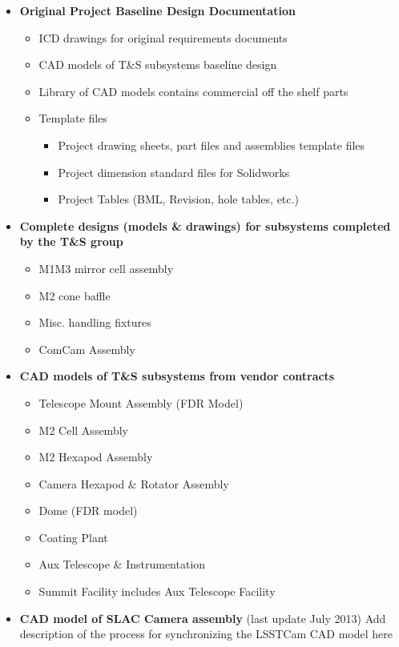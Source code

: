 \begin{itemize}
	\item {\bf Original Project Baseline Design Documentation}
	\begin{itemize}
		\item ICD drawings for original requirements documents
		\item CAD models of T\&S subsystems baseline design
		\item Library of CAD models contains commercial off the shelf parts
		\item Template files
		\begin{itemize}
			\item Project drawing sheets, part files and assemblies template files
			\item Project dimension standard files for Solidworks
			\item Project Tables (BML, Revision, hole tables, etc.)
		\end{itemize}
	\end{itemize}

	\item {\bf Complete designs (models \& drawings) for subsystems completed by the T\&S group}
	\begin{itemize}
		\item M1M3 mirror cell assembly
		\item M2 cone baffle
		\item Misc. handling fixtures
		\item ComCam Assembly
	\end{itemize}

	\item {\bf CAD models of T\&S subsystems from vendor contracts}
	\begin{itemize}
		\item Telescope Mount Assembly (FDR Model)
		\item M2 Cell Assembly
		\item M2 Hexapod Assembly
		\item Camera Hexapod \& Rotator Assembly
		\item Dome (FDR model)
		\item Coating Plant
		\item Aux Telescope \& Instrumentation
		\item Summit Facility includes Aux Telescope Facility
	\end{itemize}

	\item{\bf CAD model of SLAC Camera assembly} (last update July 2013)  Add description of the process for synchronizing the LSSTCam CAD model here

\end{itemize}
